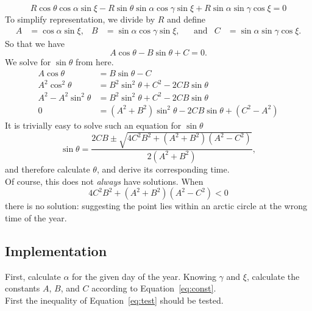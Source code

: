 \documentclass[12pt,a4paper]{article}
\begin{document}
\begin{equation}
R\cos\theta\cos\alpha\sin\xi -R \sin\theta\sin\alpha\cos\gamma\sin\xi + R\sin\alpha\sin\gamma\cos\xi = 0
\end{equation}
To simplify representation, we divide by \(R\) and define
\begin{align}\label{eq:const}
A&= \cos\alpha\sin\xi, & B&= \sin\alpha\cos\gamma\sin\xi, & &\text{and} & C&=\sin\alpha\sin\gamma\cos\xi.
\end{align}
So that we have
\begin{equation}
A\cos\theta - B\sin\theta + C = 0.
\end{equation}
We solve for \(\sin\theta\) from here.
\begin{align}
A\cos\theta  &=  B\sin\theta - C \\
A^{2}\cos^{2}\theta  &=  B^{2}\sin^{2}\theta + C^{2} - 2CB\sin\theta \\
A^{2} - A^{2}\sin^{2}\theta  &=  B^{2}\sin^{2}\theta + C^{2} - 2CB\sin\theta \\
0&=  (A^{2} + B^{2})\sin^{2}\theta - 2CB\sin\theta  + (C^{2}-A^{2})
\end{align}
It is trivially easy to solve such an equation for \(\sin\theta\)
\begin{equation}
\sin\theta = \dfrac{2CB \pm \sqrt{4C^{2}B^{2} + (A^{2}+B^{2})(A^{2}-C^{2}) }}{2(A^{2}+B^{2})},
\end{equation}
and therefore calculate \(\theta\), and derive its corresponding time.  \\[10pt]

Of course, this does not \textit{always} have solutions. When 
\begin{equation}\label{eq:test}
4C^{2}B^{2} + (A^{2}+B^{2})(A^{2}-C^{2})  < 0
\end{equation}
there is no solution: suggesting the point lies within an arctic circle at the wrong time of the year.


\subsection{Implementation}
First, calculate \(\alpha\) for the given day of the year. Knowing \(\gamma\) and \(\xi\), calculate the constants \(A\), \(B\), and \(C\) according to Equation~\eqref{eq:const}.\\

First the inequality of Equation~\eqref{eq:test} should be tested. 
\end{document}
